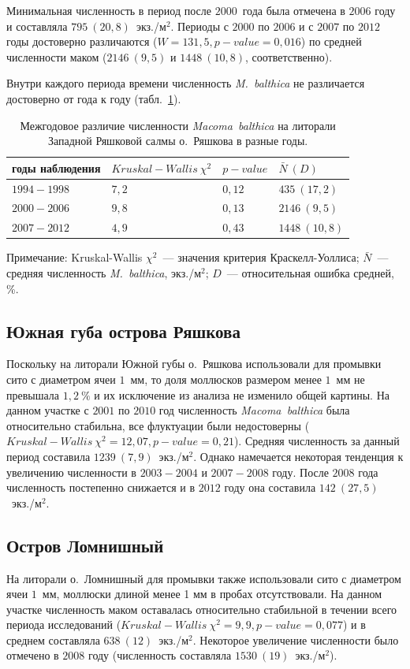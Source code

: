 Минимальная численность в период после $2000$~года была отмечена в $2006$ году и составляла $795~(20,8)$~экз./м$^2$. 
Периоды с $2000$ по $2006$ и с $2007$ по $2012$ годы достоверно различаются ($W = 131,5, p-value = 0,016$) по средней численности маком ($2146~(9,5)$ и $1448~(10,8)$, соответственно).

Внутри каждого периода времени численность {\it M.~balthica} не различается достоверно от года к году (табл.~\ref{tab:ZRS_N2_Kruskal}).

	\begin{table}[p]
	\begin{tabularx}{\textwidth}{|*{4}{X|}} \hline
	годы наблюдения & $Kruskal-Wallis\ \chi^2$ & $p-value$ & $\bar{N} ~ (D)$ \\ 
	\hline
	$1994 - 1998$ & $7,2$ & $0,12$ & $435~(17,2)$ \\
	\hline
	$2000 - 2006$ & $9,8$ & $0,13$ & $2146~(9,5)$\\
	\hline
	$2007 - 2012$ & $4,9$ & $0,43$ & $1448~(10,8)$ \\
	\hline
	\end{tabularx}
	{\footnotesize Примечание: Kruskal-Wallis $\chi^2$~--- значения критерия Краскелл-Уоллиса; $\bar{N}$~--- средняя численность {\it 	M.~balthica}, экз./м$^2$; $D$~--- относительная ошибка средней, \%.}
	\caption{Межгодовое различие численности {\it Macoma~balthica} на литорали Западной Ряшковой салмы о.~Ряшкова в разные годы.}
	\label{tab:ZRS_N2_Kruskal}
	\end{table}


		\subsection{Южная губа острова Ряшкова}
Поскольку на литорали Южной губы о.~Ряшкова использовали для промывки сито с диаметром ячеи $1$~мм, то доля моллюсков размером менее $1$~мм не превышала $1,2~\%$ и их исключение из анализа не изменило общей картины.
На данном участке с $2001$ по $2010$ год численность {\it Macoma~balthica} была относительно стабильна, все флуктуации были недостоверны ($Kruskal-Wallis\ \chi^2 = 12,07, p-value = 0,21$). 
Средняя численность за данный период составила $1239~(7,9)$~экз./м$^2$.
Однако намечается некоторая тенденция к увеличению численности в $2003-2004$ и $2007-2008$ году.
После $2008$ года численность постепенно снижается и в $2012$ году она составила $142~(27,5)$~экз./м$^2$.

		\subsection{Остров Ломнишный}
На литорали о.~Ломнишный для промывки также использовали сито с диаметром ячеи $1$~мм, моллюски длиной менее 1 мм в пробах отсутствовали.
На данном участке численность маком оставалась относительно стабильной в течении всего периода исследований ($Kruskal-Wallis\ \chi^2 = 9,9, p-value = 0,077$) и в среднем составляла $638~(12)$~экз./м$^2$.
Некоторое увеличение численности было отмечено в $2008$ году (численность составляла $1530~(19)$~экз./м$^2$).

